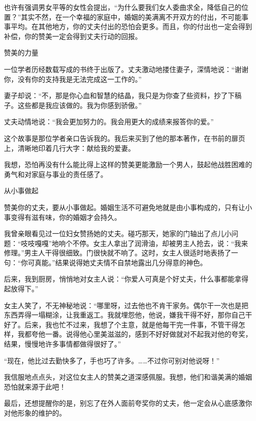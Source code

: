 \documentclass[12pt,UTF8]{ctexbook}
\begin{document}
也许有强调男女平等的女性会提出，“为什么要我们女人委曲求全，降低自己的位置？”其实不然，在一个幸福的家庭中，婚姻的美满离不开双方的付出，不可能事事平均。在其他地方，你的丈夫付出的恐怕会更多。而且，你的付出也一定会得到补偿，你的赞美一定会得到丈夫行动的回报。





赞美的力量


一位学者历经数载写成的书终于出版了。丈夫激动地搂住妻子，深情地说：“谢谢你，没有你的支持我是无法完成这一工作的。”

妻子却说：“不，那是你心血和智慧的结晶，我只是为你查了些资料，抄了下稿子。这些都是我应该做的。我为你感到骄傲。”

丈夫动情地说：“我会更加努力的。我会用更大的成绩来报答你的爱。”

这个故事是那位学者亲口告诉我的。我后来买到了他的那本著作，在书前的扉页上，清晰地印着几行大字：献给我的爱妻。

我想，恐怕再没有什么能比得上这样的赞美更能激励一个男人，鼓起他战胜困难的勇气和对家庭与事业的责任感了。





从小事做起


赞美你的丈夫，要从小事做起。婚姻生活不可避免地就是由小事构成的，只有让小事变得有滋有味，你的婚姻才会持久。

我曾亲眼看见过一位妇女赞扬她的丈夫。碰巧那天，她家的门轴出了点儿小问题：“吱吱嘎嘎”地响个不停。女主人拿出了润滑油，却被男主人抢去，说：“我来修理。”男主人干得很细致。门很快就不响了。这时，女主人很适时地表扬了一句：“你可真能。”结果说得她丈夫情不自禁地露出几分得意的神色。

后来，我到厨房，悄悄地对女主人说：“你爱人可真是个好丈夫，什么事都能拿得起放得下。”

女主人笑了，不无神秘地说：“哪里呀，过去他也不肯干家务。偶尔干一次也是把东西弄得一塌糊涂，让我重返工。我就埋怨他，他说，嫌我干得不好，那你自己干好了。后来，我也忙不过来，我想了个主意，就是他每干完一件事，不管干得怎样，我都夸他一番。说得他心里美滋滋的，感到不好好做就对不起我对他的夸奖，结果，慢慢地许多事情都做得很好了。”

“现在，他比过去勤快多了，手也巧了许多。……不过你可别对他说呀！”

我信服地点点头，对这位女主人的赞美之道深感佩服。我想，他们和谐美满的婚姻恐怕就来源于此吧！

最后，还想提醒你的是，别忘了在外人面前夸奖你的丈夫，他一定会从心底感激你对他形象的维护的。
\end{document}
